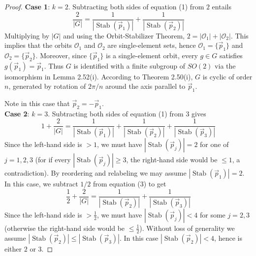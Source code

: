 \documentclass[leqno]{book}
\begin{document}
\begin{proof}
\noindent\textbf{Case 1}: $k=2$.  Subtracting both sides of equation (1) from $2$ entails
\begin{equation}\tag{2}
\frac 2{|G|}=\frac 1{|\operatorname{Stab}(\vec p_1)|}+\frac 1{|\operatorname{Stab}(\vec p_2)|}
\end{equation}
Multiplying by $|G|$ and using the Orbit-Stabilizer Theorem, $2=|\mathcal O_1|+|\mathcal O_2|$.  This implies that the orbits $\mathcal O_1$ and $\mathcal O_2$ are single-element sets, hence $\mathcal O_1=\{\vec p_1\}$ and $\mathcal O_2=\{\vec p_2\}$.  Moreover, since $\{\vec p_1\}$ is a single-element orbit, every $g\in G$ satisfies $g(\vec p_1)=\vec p_1$.  Thus $G$ is identified with a finite subgroup of $SO(2)$ via the isomorphism in Lemma 2.52(i).  According to Theorem 2.50(i), $G$ is cyclic of order $n$, generated by rotation of $2\pi/n$ around the axis parallel to $\vec p_1$.

Note in this case that $\vec p_2=-\vec p_1$.\\

\noindent\textbf{Case 2}: $k=3$.  Subtracting both sides of equation (1) from $3$ gives
\begin{equation}\tag{3}
1+\frac 2{|G|}=\frac 1{|\operatorname{Stab}(\vec p_1)|}+\frac 1{|\operatorname{Stab}(\vec p_2)|}+\frac 1{|\operatorname{Stab}(\vec p_3)|}
\end{equation}
Since the left-hand side is $>1$, we must have $|\operatorname{Stab}(\vec p_j)|=2$ for one of $j=1,2,3$ (for if every $|\operatorname{Stab}(\vec p_j)|\geqslant 3$, the right-hand side would be $\leqslant 1$, a contradiction).  By reordering and relabeling we may assume $|\operatorname{Stab}(\vec p_1)|=2$.  In this case, we subtract $1/2$ from equation (3) to get
\begin{equation}\tag{4}
\frac 12+\frac 2{|G|}=\frac 1{|\operatorname{Stab}(\vec p_2)|}+\frac 1{|\operatorname{Stab}(\vec p_3)|}
\end{equation}
Since the left-hand side is $>\frac 12$, we must have $|\operatorname{Stab}(\vec p_j)|<4$ for some $j=2,3$ (otherwise the right-hand side would be $\leqslant\frac 12$).  Without loss of generality we assume $|\operatorname{Stab}(\vec p_2)|\leqslant|\operatorname{Stab}(\vec p_3)|$.  In this case $|\operatorname{Stab}(\vec p_2)|<4$, hence is either $2$ or $3$.


\end{proof}
\end{document}
